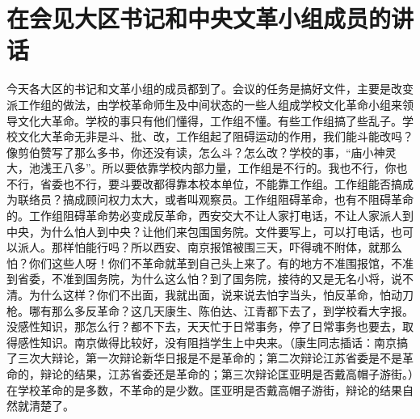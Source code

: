 \section[在会见大区书记和中央文革小组成员的讲话（一九六六年七月二十二日）]{在会见大区书记和中央文革小组成员的讲话}


今天各大区的书记和文革小组的成员都到了。会议的任务是搞好文件，主要是改变派工作组的做法，由学校革命师生及中间状态的一些人组成学校文化革命小组来领导文化大革命。学校的事只有他们懂得，工作组不懂。有些工作组搞了些乱子。学校文化大革命无非是斗、批、改，工作组起了阻碍运动的作用，我们能斗能改吗？像剪伯赞写了那么多书，你还没有读，怎么斗？怎么改？学校的事，“庙小神灵大，池浅王八多”。所以要依靠学校内部力量，工作组是不行的。我也不行，你也不行，省委也不行，要斗要改都得靠本校本单位，不能靠工作组。工作组能否搞成为联络员？搞成顾问权力太大，或者叫观察员。工作组阻碍革命，也有不阻碍革命的。工作组阻碍革命势必变成反革命，西安交大不让人家打电话，不让人家派人到中央，为什么怕人到中央？让他们来包围国务院。文件要写上，可以打电话，也可以派人。那样怕能行吗？所以西安、南京报馆被围三天，吓得魂不附体，就那么怕？你们这些人呀！你们不革命就革到自己头上来了。有的地方不准围报馆，不准到省委，不准到国务院，为什么这么怕？到了国务院，接待的又是无名小将，说不清。为什么这样？你们不出面，我就出面，说来说去怕字当头，怕反革命，怕动刀枪。哪有那么多反革命？这几天康生、陈伯达、江青都下去了，到学校看大字报。没感性知识，那怎么行？都不下去，天天忙于日常事务，停了日常事务也要去，取得感性知识。南京做得比较好，没有阻挡学生上中央来。（康生同志插话：南京搞了三次大辩论，第一次辩论新华日报是不是革命的；第二次辩论江苏省委是不是革命的，辩论的结果，江苏省委还是革命的；第三次辩论匡亚明是否戴高帽子游街。）在学校革命的是多数，不革命的是少数。匡亚明是否戴高帽子游街，辩论的结果自然就清楚了。

